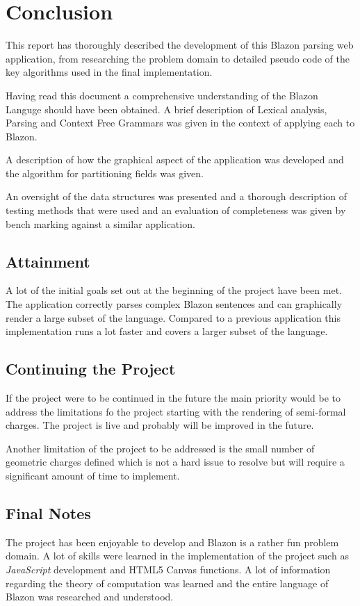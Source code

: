 \chapter{Conclusion}

This report has thoroughly described the development of this Blazon parsing web application, from researching the problem domain to detailed pseudo code of the key algorithms used in the final implementation. 

Having read this document a comprehensive understanding of the Blazon Languge should have been obtained.  A brief description of Lexical analysis, Parsing and Context Free Grammars was given in the context of applying each to Blazon. 

A description of how the graphical aspect of the application was developed and the algorithm for partitioning fields was given.     

An oversight of the data structures was presented and a thorough description of testing methods that were used and an evaluation of completeness was given by bench marking against a similar application. 

\section{Attainment}

A lot of the initial goals set out at the beginning of the project have been met.  The application correctly parses complex Blazon sentences and can graphically render a large subset of the language.  Compared to a previous application this implementation runs a lot faster and covers a larger subset of the language. 

\section{Continuing the Project}
If the project were to be continued in the future the main priority would be to address the limitations fo the project starting with the rendering of semi-formal charges.  The project is live\cite{tom} and probably will be improved in the future.  

Another limitation of the project to be addressed is the small number of geometric charges defined which is not a hard issue to resolve but will require a significant amount of time to implement. 

\section{Final Notes}

The project has been enjoyable to develop and Blazon is a rather fun problem domain.  A lot of skills were learned in the implementation of the project such as \emph{JavaScript} development and HTML5 Canvas functions.  A lot of information regarding the theory of computation was learned and the entire language of Blazon was researched and understood. 
